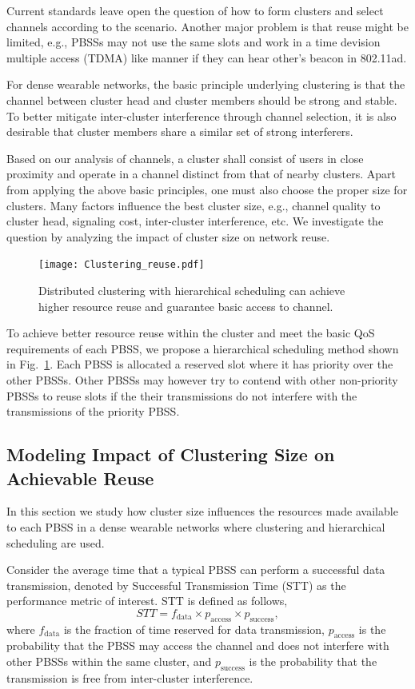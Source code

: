 \documentclass[10pt, conference, letterpaper]{IEEEtran}
\begin{document}
Current standards leave open the question of how to form clusters and select channels according to the scenario. 
Another major problem is that reuse might be limited, e.g., PBSSs may not use the same slots and work in a time devision multiple access (TDMA) like manner if they can hear other's beacon in 802.11ad.


For dense wearable networks, the basic principle underlying clustering is that the channel between cluster head and cluster members should be strong and stable. 
To better mitigate inter-cluster interference through channel selection, it is also desirable that cluster members share a similar set of strong interferers. 


Based on our analysis of channels, a cluster shall consist of users in close proximity and operate in a channel distinct from that of nearby clusters. 
Apart from applying the above basic principles, one must also choose the proper size for clusters. 
Many factors influence the best cluster size, e.g., channel quality to cluster head, signaling cost, inter-cluster interference, etc. 
We investigate the question by analyzing the impact of cluster size on network reuse. 


\begin{figure}
	\centering
	\texttt{[image: Clustering\_reuse.pdf]}
	\caption{Distributed clustering  with hierarchical scheduling can achieve higher resource reuse and guarantee basic access to channel.}
	\label{fig:clustering:reuse}
\end{figure}


To achieve better resource reuse within the cluster and meet the basic QoS requirements of each PBSS, we propose a hierarchical scheduling method shown in Fig.~\ref{fig:clustering:reuse}. 
Each PBSS is allocated a reserved slot where it has priority over the other PBSSs. 
Other PBSSs may however try to contend with other non-priority PBSSs to reuse slots if the their transmissions do not interfere with the transmissions of the priority PBSS.


\subsection{Modeling Impact of Clustering Size on Achievable Reuse}
In this section we study how cluster size influences the resources made available to each PBSS in a dense wearable networks where clustering and hierarchical scheduling are used. 


Consider the average time that a typical PBSS can perform a successful data transmission, denoted by Successful Transmission Time (STT) as the performance metric of interest.
STT is defined as follows, 
\begin{equation*}
STT = f_{\mathrm{data}}\times p_{\mathrm{access}} \times p_{\mathrm{success}},
\end{equation*}
where $f_{\mathrm{data}}$ is the fraction of time reserved for data transmission, $p_{\mathrm{access}}$ is the probability that the PBSS may access the channel and does not interfere with other PBSSs within the same cluster,
and $p_{\mathrm{success}}$ is the probability that the transmission is free from inter-cluster interference.
\end{document}
